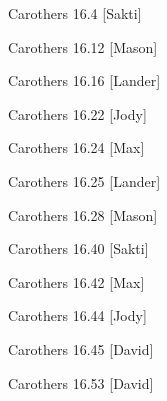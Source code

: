 \documentclass[minion]{homework}
\begin{document}
\begin{aproblems}

\hproblem Carothers 16.4 [Sakti]

\hproblem Carothers 16.12 [Mason]

\hproblem Carothers 16.16 [Lander]

\hproblem Carothers 16.22 [Jody]

\hproblem Carothers 16.24 [Max]

\hproblem Carothers 16.25 [Lander]

\hproblem Carothers 16.28 [Mason]

\hproblem Carothers 16.40 [Sakti]

\hproblem Carothers 16.42 [Max]

\hproblem Carothers 16.44 [Jody]

\hproblem Carothers 16.45 [David]

\hproblem Carothers 16.53 [David]

\end{aproblems}
\end{document}
